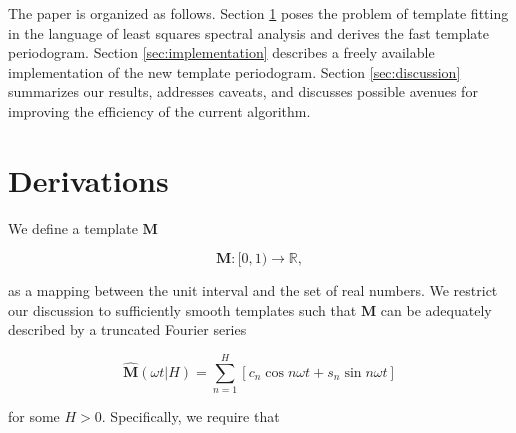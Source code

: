 \documentclass[iop]{emulateapj}
\newcommand{\todo}[1]{{\bf #1}}
\begin{document}
The paper is organized as follows. Section \ref{sec:derivations} poses the problem of template
fitting in the language of least squares spectral analysis and derives the fast template
periodogram. Section \ref{sec:implementation} describes a freely available implementation 
of the new template periodogram. Section \ref{sec:discussion} summarizes our results, 
addresses caveats, and discusses possible avenues for improving the efficiency of the current 
algorithm.





\section{Derivations}\label{sec:derivations}

We define a template $\mathbf{M}$

\begin{equation}
    \mathbf{M} : [0, 1)\rightarrow\mathbb{R},
\end{equation}

\noindent as a mapping between the unit interval and the set of real numbers. We
restrict our discussion to sufficiently smooth templates such that
$\mathbf{M}$ can be adequately described by a truncated Fourier series

\begin{equation}
    \hat{\mathbf{M}}(\omega t|H) = \sum_{n=1}^H\left[c_n\cos{n\omega t} + s_n\sin{n\omega t}\right]
\end{equation}

\noindent for some $H > 0$. Specifically, we require that 
\end{document}
